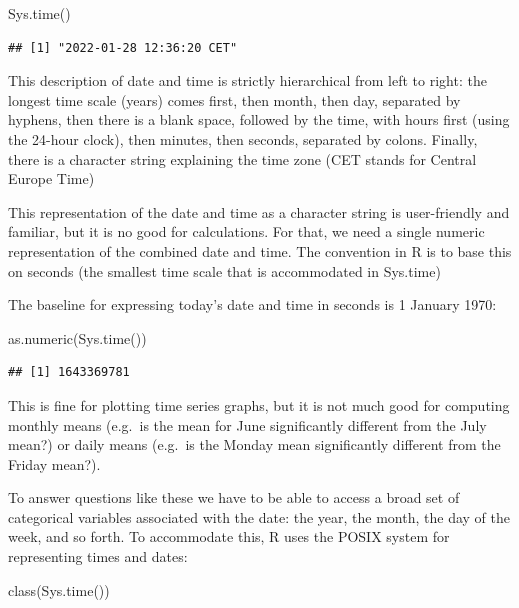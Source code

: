 \documentclass[
]{book}
\newenvironment{Shaded}{\begin{snugshade}}{\end{snugshade}}
\newcommand{\FunctionTok}[1]{\textcolor[rgb]{0.00,0.00,0.00}{#1}}
\newcommand{\NormalTok}[1]{#1}
\theoremstyle{definition}
\theoremstyle{definition}
\theoremstyle{definition}
\theoremstyle{definition}
\theoremstyle{remark}
\begin{document}
\begin{Shaded}
\begin{Highlighting}[]
\FunctionTok{Sys.time}\NormalTok{()}
\end{Highlighting}
\end{Shaded}

\begin{verbatim}
## [1] "2022-01-28 12:36:20 CET"
\end{verbatim}

This description of date and time is strictly hierarchical from left to right: the longest time scale (years) comes first, then month, then day, separated by hyphens, then there is a blank space, followed by the time, with hours first (using the 24-hour clock), then minutes, then seconds, separated by colons. Finally, there is a character string explaining the time zone (CET stands for Central Europe Time)

This representation of the date and time as a character string is user-friendly and familiar, but it is no good for calculations. For that, we need a single numeric representation of the combined date and time. The convention in R is to base this on seconds (the smallest time scale that is accommodated in Sys.time)

The baseline for expressing today's date and time in seconds is 1 January 1970:

\begin{Shaded}
\begin{Highlighting}[]
\FunctionTok{as.numeric}\NormalTok{(}\FunctionTok{Sys.time}\NormalTok{())}
\end{Highlighting}
\end{Shaded}

\begin{verbatim}
## [1] 1643369781
\end{verbatim}

This is fine for plotting time series graphs, but it is not much good for computing monthly means (e.g.~is the mean for June significantly different from the July mean?) or daily means (e.g.~is the Monday mean significantly different from the Friday mean?).

To answer questions like these we have to be able to access a broad set of categorical variables associated with the date: the year, the month, the day of the week, and so forth. To accommodate this, R uses the POSIX system for representing times and dates:

\begin{Shaded}
\begin{Highlighting}[]
\FunctionTok{class}\NormalTok{(}\FunctionTok{Sys.time}\NormalTok{())}
\end{Highlighting}
\end{Shaded}
\end{document}
